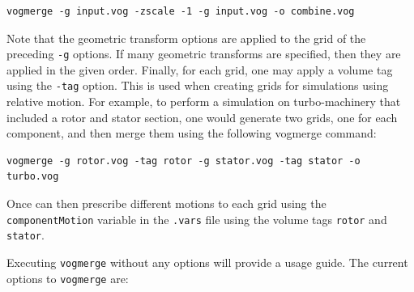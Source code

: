 \documentclass{article}
\begin{document}
\begin{verbatim}
vogmerge -g input.vog -zscale -1 -g input.vog -o combine.vog
\end{verbatim}

Note that the geometric transform options are applied to the grid of
the preceding {\tt -g} options.  If many geometric transforms are
specified, then they are applied in the given order.  Finally, for
each grid, one may apply a volume tag using the {\tt -tag} option.
This is used when creating grids for simulations using relative
motion.  For example, to perform a simulation on turbo-machinery that
included a rotor and stator section, one would generate two grids, one
for each component, and then merge them using the following vogmerge
command:
\begin{verbatim}
vogmerge -g rotor.vog -tag rotor -g stator.vog -tag stator -o turbo.vog
\end{verbatim}
Once can then prescribe different motions to each grid using the {\tt
  componentMotion} variable in the {\tt .vars} file using the volume tags
{\tt rotor} and {\tt stator}.

Executing {\tt vogmerge} without any options will provide a usage guide.
The current options to {\tt vogmerge} are:
\end{document}
